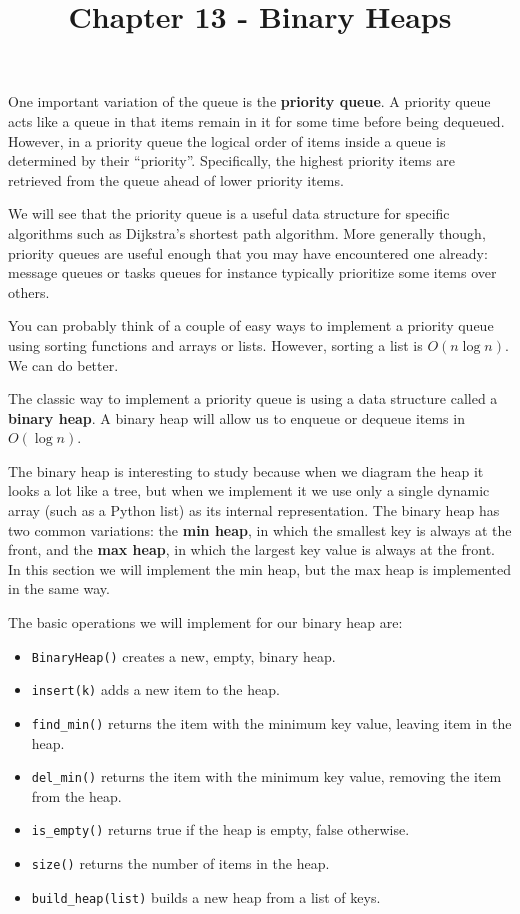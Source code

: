 \documentclass[11pt]{article}
\title{Chapter 13 - Binary Heaps}
\providecommand{\tightlist}{%
      \setlength{\itemsep}{0pt}\setlength{\parskip}{0pt}}
\begin{document}
    
    \maketitle
    
    

    
    One important variation of the queue is the \textbf{priority queue}. A
priority queue acts like a queue in that items remain in it for some
time before being dequeued. However, in a priority queue the logical
order of items inside a queue is determined by their ``priority''.
Specifically, the highest priority items are retrieved from the queue
ahead of lower priority items.

We will see that the priority queue is a useful data structure for
specific algorithms such as Dijkstra's shortest path algorithm. More
generally though, priority queues are useful enough that you may have
encountered one already: message queues or tasks queues for instance
typically prioritize some items over others.

You can probably think of a couple of easy ways to implement a priority
queue using sorting functions and arrays or lists. However, sorting a
list is \(O(n \log{n})\). We can do better.

The classic way to implement a priority queue is using a data structure
called a \textbf{binary heap}. A binary heap will allow us to enqueue or
dequeue items in \(O(\log{n})\).

The binary heap is interesting to study because when we diagram the heap
it looks a lot like a tree, but when we implement it we use only a
single dynamic array (such as a Python list) as its internal
representation. The binary heap has two common variations: the
\textbf{min heap}, in which the smallest key is always at the front, and
the \textbf{max heap}, in which the largest key value is always at the
front. In this section we will implement the min heap, but the max heap
is implemented in the same way.

The basic operations we will implement for our binary heap are:

\begin{itemize}
\tightlist
\item
  \texttt{BinaryHeap()} creates a new, empty, binary heap.
\item
  \texttt{insert(k)} adds a new item to the heap.
\item
  \texttt{find\_min()} returns the item with the minimum key value,
  leaving item in the heap.
\item
  \texttt{del\_min()} returns the item with the minimum key value,
  removing the item from the heap.
\item
  \texttt{is\_empty()} returns true if the heap is empty, false
  otherwise.
\item
  \texttt{size()} returns the number of items in the heap.
\item
  \texttt{build\_heap(list)} builds a new heap from a list of keys.
\end{itemize}
\end{document}
